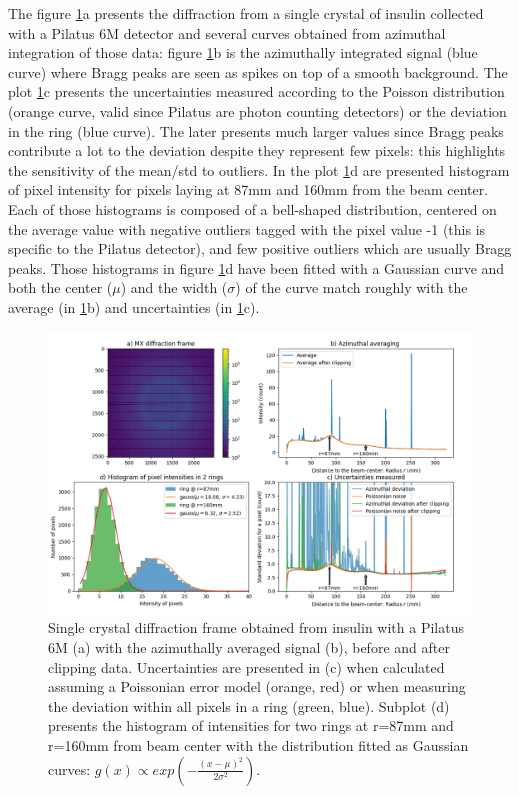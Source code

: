 \documentclass[preprint]{iucr}              %
\begin{document}
The figure \ref{fig1}a presents the diffraction from a single crystal of insulin collected with a Pilatus 6M detector and several curves obtained from azimuthal integration of those data: 
figure \ref{fig1}b is the azimuthally integrated signal (blue curve) where Bragg peaks are seen as spikes on top of a smooth background.
The plot \ref{fig1}c presents the uncertainties measured according to the Poisson distribution (orange curve, valid since Pilatus are photon counting detectors) 
or the deviation in the ring (blue curve). 
The later presents much larger values since Bragg peaks contribute a lot to the deviation despite they represent few pixels: this highlights the sensitivity of the mean/std to outliers.
In the plot \ref{fig1}d are presented histogram of pixel intensity for pixels laying at 87mm and 160mm from the beam center. 
Each of those histograms is composed of a bell-shaped distribution, centered on the average value with negative outliers tagged with the pixel value -1 (this is specific to the Pilatus detector), and few positive outliers which are usually Bragg peaks.   
Those histograms in figure \ref{fig1}d have been fitted with a Gaussian curve and both the center ($\mu$) and the width ($\sigma$) of the curve match 
roughly with the average (in \ref{fig1}b) and uncertainties (in \ref{fig1}c).  
\begin{figure}
\label{fig1}
\begin{center}
\includegraphics[width=14cm]{fig1}
\caption{Single crystal diffraction frame obtained from insulin with a Pilatus 6M (a) with the azimuthally averaged signal (b), 
before and after clipping data. Uncertainties are presented in (c) when calculated assuming a Poissonian error model (orange, red) or when measuring the deviation within all pixels in a ring (green, blue).
Subplot (d) presents the histogram of intensities for two rings at r=87mm and r=160mm from beam center with the distribution fitted as Gaussian curves: $g(x)\propto exp(-\frac{(x-\mu)^2}{2\sigma^2})$.}
\end{center}
\end{figure}
\end{document}
